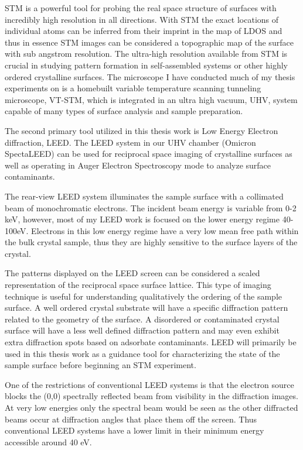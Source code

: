 STM is a powerful tool for probing the real space structure of surfaces with incredibly high resolution in all directions. With STM the exact locations of individual atoms can be inferred from their imprint in the map of LDOS and thus in essence STM images can be considered a topographic map of the surface with sub angstrom resolution. The ultra-high resolution available from STM is crucial in studying pattern formation in self-assembled systems or other highly ordered crystalline surfaces. The microscope I have conducted much of my thesis experiments on is a homebuilt variable temperature scanning tunneling microscope, VT-STM, which is integrated in an ultra high vacuum, UHV, system capable of many types of surface analysis and sample preparation.

The second primary tool utilized in this thesis work is Low Energy Electron diffraction, LEED. The LEED system in our UHV chamber (Omicron SpectaLEED) can be used for reciprocal space imaging of crystalline surfaces as well as operating in Auger Electron Spectroscopy mode to analyze surface contaminants.

The rear-view LEED system illuminates the sample surface with a collimated beam of monochromatic electrons. The incident beam energy is variable from 0-2 keV, however, most of my LEED work is focused on the lower energy regime 40-100eV. Electrons in this low energy regime have a very low mean free path within the bulk crystal sample, thus they are highly sensitive to the surface layers of the crystal.

The patterns displayed on the LEED screen can be considered a scaled representation of the reciprocal space surface lattice. This type of imaging technique is useful for understanding qualitatively the ordering of the sample surface. A well ordered crystal substrate will have a specific diffraction pattern related to the geometry of the surface. A disordered or contaminated crystal surface will have a less well defined diffraction pattern and may even exhibit extra diffraction spots based on adsorbate contaminants. LEED will primarily be used in this thesis work as a guidance tool for characterizing the state of the sample surface before beginning an STM experiment.

One of the restrictions of conventional LEED systems is that the electron source blocks the (0,0) spectrally reflected beam from visibility in the diffraction images. At very low energies only the spectral beam would be seen as the other diffracted beams occur at diffraction angles that place them off the screen. Thus conventional LEED systems have a lower limit in their minimum energy accessible around 40 eV. 

